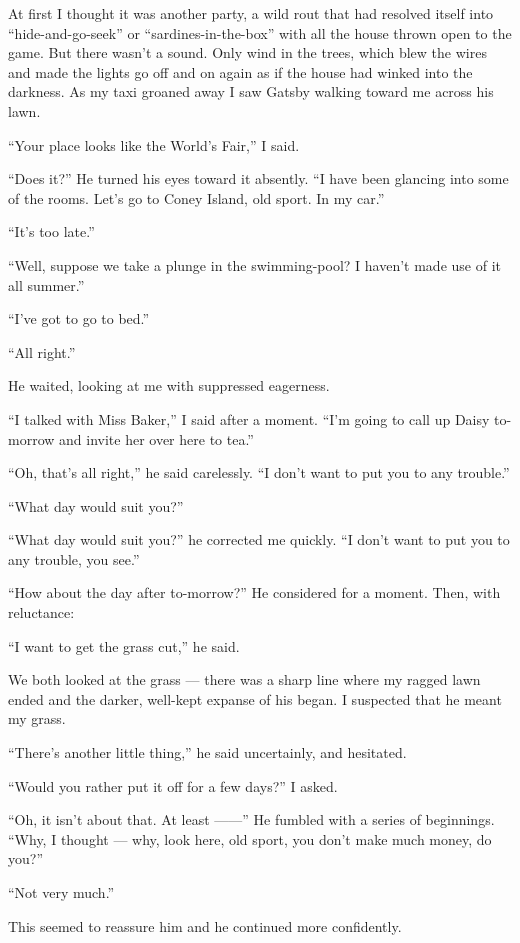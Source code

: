 \documentclass{znotebook}
\begin{document}
At first I thought it was another party, a wild rout that had resolved itself into ``hide-and-go-seek'' or ``sardines-in-the-box'' with all the house thrown open to the game. But there wasn’t a sound. Only wind in the trees, which blew the wires and made the lights go off and on again as if the house had winked into the darkness. As my taxi groaned away I saw Gatsby walking toward me across his lawn.

``Your place looks like the World’s Fair,'' I said.

``Does it?'' He turned his eyes toward it absently. ``I have been glancing into some of the rooms. Let’s go to Coney Island, old sport. In my car.''

``It’s too late.''

``Well, suppose we take a plunge in the swimming-pool? I haven’t made use of it all summer.''

``I’ve got to go to bed.''

``All right.''

He waited, looking at me with suppressed eagerness.

``I talked with Miss Baker,'' I said after a moment. ``I’m going to call up Daisy to-morrow and invite her over here to tea.''

``Oh, that’s all right,'' he said carelessly. ``I don’t want to put you to any trouble.''

``What day would suit you?''

``What day would suit you?'' he corrected me quickly. ``I don’t want to put you to any trouble, you see.''

``How about the day after to-morrow?'' He considered for a moment. Then, with reluctance:

``I want to get the grass cut,'' he said.

We both looked at the grass — there was a sharp line where my ragged lawn ended and the darker, well-kept expanse of his began. I suspected that he meant my grass.

``There’s another little thing,'' he said uncertainly, and hesitated.

``Would you rather put it off for a few days?'' I asked.

``Oh, it isn’t about that. At least ——'' He fumbled with a series of beginnings. ``Why, I thought — why, look here, old sport, you don’t make much money, do you?''

``Not very much.''

This seemed to reassure him and he continued more confidently.
\end{document}
